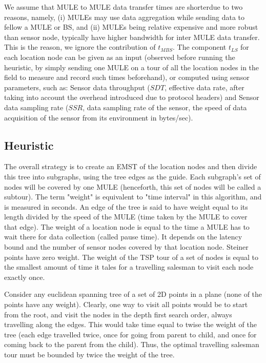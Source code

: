 We assume that MULE to MULE data transfer times are shorterdue to two reasons, namely, (i) MULEs may use data aggregation while sending data to fellow a MULE or BS, and (ii) MULEs being relative expensive and more robust than sensor node, typically have higher bandwidth for inter MULE data transfer. This is the reason, we ignore the contribution of $t_{MBS}$. The component $t_{LS}$ for each location node can be given as an input (observed before running the heuristic, by simply sending one MULE on a tour of all the location nodes in the field to measure and record such times beforehand), or computed using sensor parameters, such as: Sensor data throughput ($SDT$, effective data rate, after taking into account the overhead introduced due to protocol headers) and Sensor data sampling rate ($SSR$, data sampling rate of the sensor, the speed of data acquisition of the sensor from its environment in bytes/sec).


\subsection{Heuristic}

The overall strategy is to create an EMST of the location nodes and then divide this tree into subgraphs, using the tree edges as the guide. Each subgraph's set of nodes will be covered by one MULE (henceforth, this set of nodes will be called a subtour). The term "weight" is equivalent to "time interval" in this algorithm, and is measured in seconds. An edge of the tree is said to have weight equal to its length divided by the speed of the MULE (time taken by the MULE to cover that edge). The weight of a location node is equal to the time a MULE has to wait there for data collection (called pause time). It depends on the latency bound and the number of sensor nodes covered by that location node. Steiner points have zero weight. The weight of the TSP tour of a set of nodes is equal to the smallest amount of time it tales for a travelling salesman to visit each node exactly once.

Consider any euclidean spanning tree of a set of 2D points in a plane (none of the points have any weight). Clearly, one way to visit all points would be to start from the root, and visit the nodes in the depth first search order, always travelling along the edges. This would take time equal to twise the weight of the tree (each edge travelled twice, once for going from parent to child, and once for coming back to the parent from the child). Thus, the optimal travelling salesman tour must be bounded by twice the weight of the tree. 

